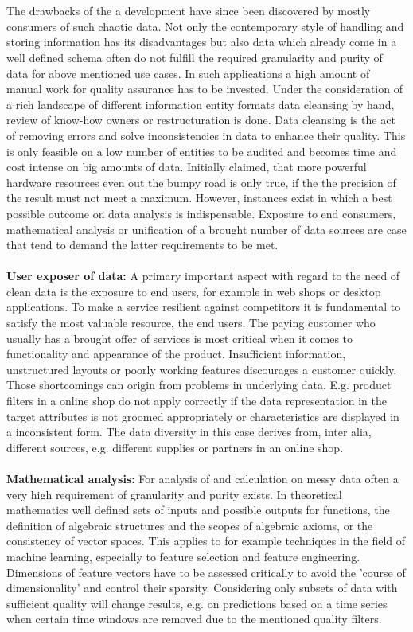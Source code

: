 \\\\
The drawbacks of the a development have since been discovered by mostly consumers of such chaotic data. Not only the contemporary style of handling and storing information has its disadvantages but also data which already come in a well defined schema often do not fulfill the required granularity and purity of data for above mentioned use cases. In such applications a high amount of manual work for quality assurance has to be invested. Under the consideration of a rich landscape of different information entity formats data cleansing by hand, review of know-how owners or restructuration is done. Data cleansing is the act of removing errors and solve inconsistencies in data to enhance their quality. This is only feasible on a low number of entities to be audited and becomes time and cost intense on big amounts of data. Initially claimed, that more powerful hardware resources even out the bumpy road is only true, if the the precision of the result must not meet a maximum. However, instances exist in which a best possible outcome on data analysis is indispensable. Exposure to end consumers, mathematical analysis or unification of a brought number of data sources are case that tend to demand the latter requirements to be met. 
\\\\
\textbf{User exposer of data:} A primary important aspect with regard to the need of clean data is the exposure to end users, for example in web shops or desktop applications. To make a service resilient against competitors it is fundamental to satisfy the most valuable resource, the end users. The paying customer who usually has a brought offer of services is most critical when it comes to functionality and appearance of the product. Insufficient information, unstructured layouts or poorly working features discourages a customer quickly. Those shortcomings can origin from problems in underlying data. E.g. product filters in a online shop do not apply correctly if the data representation in the target attributes is not groomed appropriately or characteristics are displayed in a inconsistent form. The data diversity in this case derives from, inter alia, different sources, e.g. different supplies or partners in an online shop.
\\\\
\textbf{Mathematical analysis:} For analysis of and calculation on messy data often a very high requirement of granularity and purity exists. In theoretical mathematics well defined sets of inputs and possible outputs for functions, the definition of algebraic structures and the scopes of algebraic axioms, or the consistency of vector spaces. This applies to for example techniques in the field of machine learning, especially to feature selection and feature engineering. Dimensions of feature vectors have to be assessed critically to avoid the 'course of dimensionality' and control their sparsity. Considering only subsets of data with sufficient quality will change results, e.g. on predictions based on a time series when certain time windows are removed due to the mentioned quality filters.
